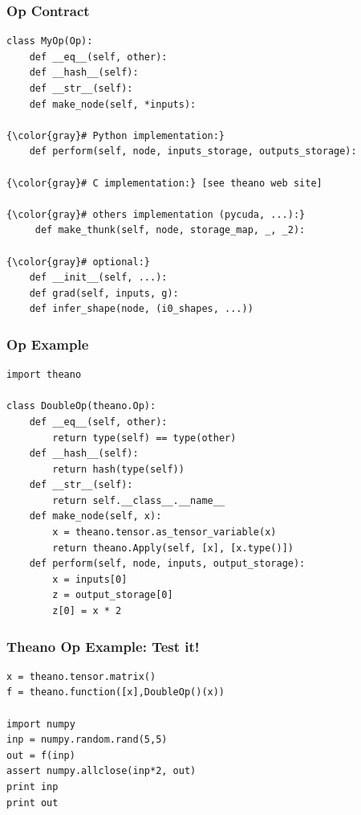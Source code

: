 \documentclass[a4paper,9pt]{beamer}
\begin{document}
\begin{frame}[fragile]
\frametitle{Op Contract}
\begin{Verbatim}[commandchars=\\\{\}]
class MyOp(Op):
    def __eq__(self, other):
    def __hash__(self):
    def __str__(self):
    def make_node(self, *inputs):

{\color{gray}# Python implementation:}
    def perform(self, node, inputs_storage, outputs_storage):

{\color{gray}# C implementation:} [see theano web site]

{\color{gray}# others implementation (pycuda, ...):}
     def make_thunk(self, node, storage_map, _, _2):

{\color{gray}# optional:}
    def __init__(self, ...):
    def grad(self, inputs, g):
    def infer_shape(node, (i0_shapes, ...))
\end{Verbatim}
\end{frame}

\begin{frame}[fragile]
\frametitle{Op Example}
\begin{Verbatim}
import theano

class DoubleOp(theano.Op):
    def __eq__(self, other):
        return type(self) == type(other)
    def __hash__(self):
        return hash(type(self))
    def __str__(self):
        return self.__class__.__name__
    def make_node(self, x):
        x = theano.tensor.as_tensor_variable(x)
        return theano.Apply(self, [x], [x.type()])
    def perform(self, node, inputs, output_storage):
        x = inputs[0]
        z = output_storage[0]
        z[0] = x * 2

\end{Verbatim}
\end{frame}

\begin{frame}[fragile]
\frametitle{Theano Op Example: Test it!}
\begin{Verbatim}
x = theano.tensor.matrix()
f = theano.function([x],DoubleOp()(x))

import numpy
inp = numpy.random.rand(5,5)
out = f(inp)
assert numpy.allclose(inp*2, out)
print inp
print out
\end{Verbatim}
\end{frame}
\end{document}
